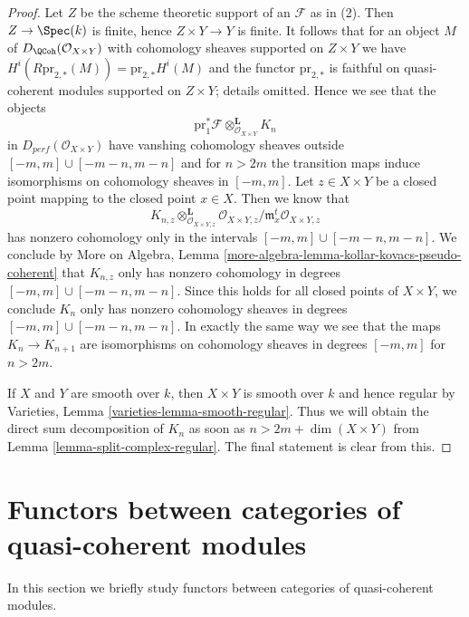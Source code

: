 \begin{proof}
Let $Z$ be the scheme theoretic support of an $\mathcal{F}$ as in (2).
Then $Z \to \Spec(k)$ is finite, hence $Z \times Y \to Y$ is finite.
It follows that for an object $M$ of $D_\QCoh(\mathcal{O}_{X \times Y})$
with cohomology sheaves supported on $Z \times Y$ we have
$H^i(R\text{pr}_{2, *}(M)) = \text{pr}_{2, *}H^i(M)$ and the functor
$\text{pr}_{2, *}$ is faithful on quasi-coherent modules supported
on $Z \times Y$; details omitted. Hence we see that the objects
$$
\text{pr}_1^*\mathcal{F} \otimes_{\mathcal{O}_{X \times Y}}^\mathbf{L} K_n
$$
in $D_{perf}(\mathcal{O}_{X \times Y})$ have vanshing cohomology sheaves
outside $[-m, m] \cup [-m - n, m - n]$ and for $n > 2m$ the transition maps
induce isomorphisms on cohomology sheaves in $[-m, m]$.
Let $z \in X \times Y$ be a closed point mapping to the closed point
$x \in X$. Then we know that
$$
K_{n, z} \otimes_{\mathcal{O}_{X \times Y, z}}^\mathbf{L}
\mathcal{O}_{X \times Y, z}/\mathfrak m_x^t\mathcal{O}_{X \times Y, z}
$$
has nonzero cohomology only in the intervals
$[-m, m] \cup [-m - n, m - n]$.
We conclude by More on Algebra, Lemma
\ref{more-algebra-lemma-kollar-kovacs-pseudo-coherent}
that $K_{n, z}$ only has nonzero cohomology
in degrees $[-m, m] \cup [-m - n, m - n]$. Since this holds for all
closed points of $X \times Y$, we conclude $K_n$ only has nonzero
cohomology sheaves in degrees $[-m, m] \cup [-m - n, m - n]$.
In exactly the same way we see that the maps $K_n \to K_{n + 1}$
are isomorphisms on cohomology sheaves in degrees $[-m, m]$
for $n > 2m$.

\medskip\noindent
If $X$ and $Y$ are smooth over $k$, then $X \times Y$ is smooth
over $k$ and hence regular by
Varieties, Lemma \ref{varieties-lemma-smooth-regular}.
Thus we will obtain the direct sum decomposition of $K_n$
as soon as $n > 2m + \dim(X \times Y)$ from
Lemma \ref{lemma-split-complex-regular}. The final statement
is clear from this.
\end{proof}









\section{Functors between categories of quasi-coherent modules}
\label{section-functor-quasi-coherent}

\noindent
In this section we briefly study functors between categories of
quasi-coherent modules.


